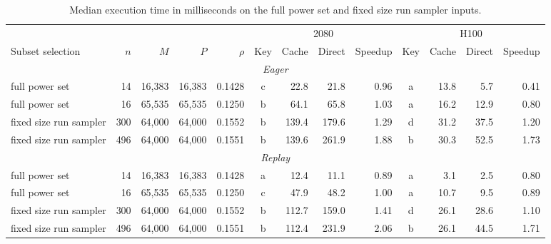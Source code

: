 \begin{table}[!htbp]
\caption{Median execution time in milliseconds on the full power set and fixed size run sampler inputs.}
\label{tab:boundary}
\footnotesize
\setlength{\tabcolsep}{2.5pt}
\begin{tabular}{lrrrr crrr crrr}
\toprule
 &  &  &  &  & \multicolumn{4}{c}{2080} & \multicolumn{4}{c}{H100} \\
\cmidrule(lr){6-9} \cmidrule(lr){10-13}
Subset selection & $n$ & $M$ & $P$ & $\rho$ & Key & Cache & Direct & Speedup & Key & Cache & Direct & Speedup \\
\midrule
\multicolumn{13}{c}{\textit{Eager}} \\
full power set & 14 & 16,383 & 16,383 & 0.1428 & c & 22.8 & 21.8 & 0.96 & a & 13.8 & 5.7 & 0.41 \\
full power set & 16 & 65,535 & 65,535 & 0.1250 & b & 64.1 & 65.8 & 1.03 & a & 16.2 & 12.9 & 0.80 \\
fixed size run sampler & 300 & 64,000 & 64,000 & 0.1552 & b & 139.4 & 179.6 & 1.29 & d & 31.2 & 37.5 & 1.20 \\
fixed size run sampler & 496 & 64,000 & 64,000 & 0.1551 & b & 139.6 & 261.9 & 1.88 & b & 30.3 & 52.5 & 1.73 \\
\midrule
\multicolumn{13}{c}{\textit{Replay}} \\
full power set & 14 & 16,383 & 16,383 & 0.1428 & a & 12.4 & 11.1 & 0.89 & a & 3.1 & 2.5 & 0.80 \\
full power set & 16 & 65,535 & 65,535 & 0.1250 & c & 47.9 & 48.2 & 1.00 & a & 10.7 & 9.5 & 0.89 \\
fixed size run sampler & 300 & 64,000 & 64,000 & 0.1552 & b & 112.7 & 159.0 & 1.41 & d & 26.1 & 28.6 & 1.10 \\
fixed size run sampler & 496 & 64,000 & 64,000 & 0.1551 & b & 112.4 & 231.9 & 2.06 & b & 26.1 & 44.5 & 1.71 \\
\bottomrule
\end{tabular}
\end{table}